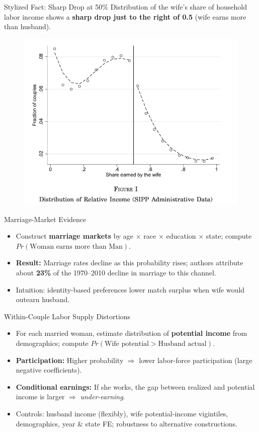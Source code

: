 \documentclass[11pt,notes=hide,aspectratio=169,mathserif]{beamer}
\begin{document}
\begin{frame}{Stylized Fact: Sharp Drop at 50\%}
Distribution of the wife's share of household labor income shows a \textbf{sharp drop just to the right of 0.5} (wife earns more than husband).\\[0.4em]
\begin{figure}
\centering
\includegraphics[width=0.5\linewidth]{inputs/paper2_fig1.png}
\end{figure}
\end{frame}

\begin{frame}{Marriage-Market Evidence}
\small
\begin{itemize}
  \item Construct \textbf{marriage markets} by age $\times$ race $\times$ education $\times$ state; compute $Pr(\text{Woman earns more than Man})$.
  \item \textbf{Result:} Marriage rates decline as this probability rises; authors attribute about \textbf{23\%} of the 1970--2010 decline in marriage to this channel.
  \item Intuition: identity-based preferences lower match surplus when wife would outearn husband.
\end{itemize}
\end{frame}

\begin{frame}{Within-Couple Labor Supply Distortions}
\small
\begin{itemize}
  \item For each married woman, estimate distribution of \textbf{potential income} from demographics; compute $Pr(\text{Wife potential} > \text{Husband actual})$.
  \item \textbf{Participation:} Higher probability $\Rightarrow$ lower labor-force participation (large negative coefficients).
  \item \textbf{Conditional earnings:} If she works, the gap between realized and potential income is larger $\Rightarrow$ \emph{under-earning}.
  \item Controls: husband income (flexibly), wife potential-income vigintiles, demographics, year \& state FE; robustness to alternative constructions.
\end{itemize}
\end{frame}
\end{document}
